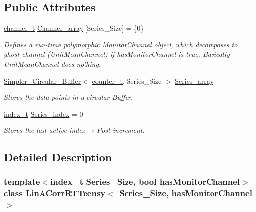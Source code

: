 \subsection*{Public Attributes}
\begin{DoxyCompactItemize}
\item 
\hyperlink{types_8hpp_a75c7fcc48d1c8ecab2174a01ab7eb21c}{channel\+\_\+t} \hyperlink{classLinACorrRTTeensy_a3276cb9bb215af9676edc35958c889b8}{Channel\+\_\+array} \mbox{[}Series\+\_\+\+Size\mbox{]} = \{0\}
\begin{DoxyCompactList}\small\item\em Defines a run-\/time polymorphic \hyperlink{classMonitorChannel}{Monitor\+Channel} object, which decomposes to {\ttfamily ghost} channel (Unit\+Mean\+Channel) if {\ttfamily has\+Monitor\+Channel} is true. Basically {\ttfamily Unit\+Mean\+Channel} does nothing. \end{DoxyCompactList}\item 
\hyperlink{classSimpler__Circular__Buffer}{Simpler\+\_\+\+Circular\+\_\+\+Buffer}$<$ \hyperlink{types_8hpp_a22f279793847eba127de149437848c48}{counter\+\_\+t}, Series\+\_\+\+Size $>$ \hyperlink{classLinACorrRTTeensy_a5c4cc1fe032812d6290579c7c8b22e57}{Series\+\_\+array}
\begin{DoxyCompactList}\small\item\em Stores the data points in a circular Buffer. \end{DoxyCompactList}\item 
\hyperlink{types_8hpp_ab41b824af8e088d090c0b9e60f536c9d}{index\+\_\+t} \hyperlink{classLinACorrRTTeensy_abe0523ada55375281deacb143b6055b7}{Series\+\_\+index} = 0
\begin{DoxyCompactList}\small\item\em Stores the last active index → Post-\/increment. \end{DoxyCompactList}\end{DoxyCompactItemize}


\subsection{Detailed Description}
\subsubsection*{template$<$index\+\_\+t Series\+\_\+\+Size, bool has\+Monitor\+Channel$>$\newline
class Lin\+A\+Corr\+R\+T\+Teensy$<$ Series\+\_\+\+Size, has\+Monitor\+Channel $>$}

